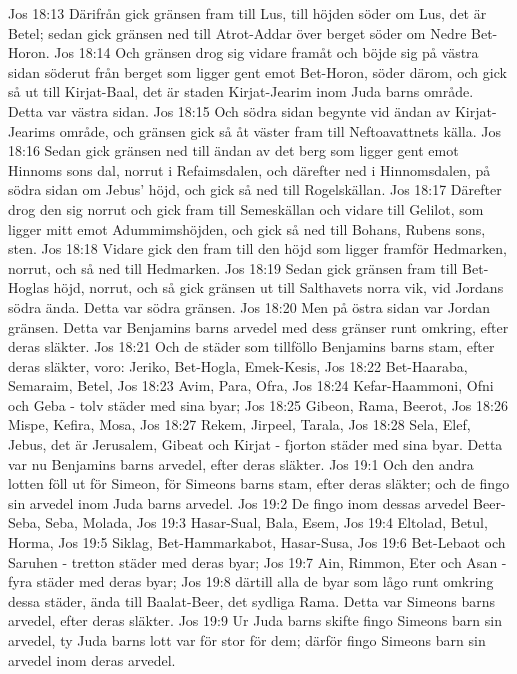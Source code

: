 Jos 18:13  Därifrån gick gränsen fram till Lus, till höjden söder om Lus, det är Betel; sedan gick gränsen ned till Atrot-Addar över berget söder om Nedre Bet-Horon.
Jos 18:14  Och gränsen drog sig vidare framåt och böjde sig på västra sidan söderut från berget som ligger gent emot Bet-Horon, söder därom, och gick så ut till Kirjat-Baal, det är staden Kirjat-Jearim inom Juda barns område. Detta var västra sidan.
Jos 18:15  Och södra sidan begynte vid ändan av Kirjat-Jearims område, och gränsen gick så åt väster fram till Neftoavattnets källa.
Jos 18:16  Sedan gick gränsen ned till ändan av det berg som ligger gent emot Hinnoms sons dal, norrut i Refaimsdalen, och därefter ned i Hinnomsdalen, på södra sidan om Jebus' höjd, och gick så ned till Rogelskällan.
Jos 18:17  Därefter drog den sig norrut och gick fram till Semeskällan och vidare till Gelilot, som ligger mitt emot Adummimshöjden, och gick så ned till Bohans, Rubens sons, sten.
Jos 18:18  Vidare gick den fram till den höjd som ligger framför Hedmarken, norrut, och så ned till Hedmarken.
Jos 18:19  Sedan gick gränsen fram till Bet-Hoglas höjd, norrut, och så gick gränsen ut till Salthavets norra vik, vid Jordans södra ända. Detta var södra gränsen.
Jos 18:20  Men på östra sidan var Jordan gränsen. Detta var Benjamins barns arvedel med dess gränser runt omkring, efter deras släkter.
Jos 18:21  Och de städer som tillföllo Benjamins barns stam, efter deras släkter, voro: Jeriko, Bet-Hogla, Emek-Kesis,
Jos 18:22  Bet-Haaraba, Semaraim, Betel,
Jos 18:23  Avim, Para, Ofra,
Jos 18:24  Kefar-Haammoni, Ofni och Geba - tolv städer med sina byar;
Jos 18:25  Gibeon, Rama, Beerot,
Jos 18:26  Mispe, Kefira, Mosa,
Jos 18:27  Rekem, Jirpeel, Tarala,
Jos 18:28  Sela, Elef, Jebus, det är Jerusalem, Gibeat och Kirjat - fjorton städer med sina byar. Detta var nu Benjamins barns arvedel, efter deras släkter.
Jos 19:1  Och den andra lotten föll ut för Simeon, för Simeons barns stam, efter deras släkter; och de fingo sin arvedel inom Juda barns arvedel.
Jos 19:2  De fingo inom dessas arvedel Beer-Seba, Seba, Molada,
Jos 19:3  Hasar-Sual, Bala, Esem,
Jos 19:4  Eltolad, Betul, Horma,
Jos 19:5  Siklag, Bet-Hammarkabot, Hasar-Susa,
Jos 19:6  Bet-Lebaot och Saruhen - tretton städer med deras byar;
Jos 19:7  Ain, Rimmon, Eter och Asan - fyra städer med deras byar;
Jos 19:8  därtill alla de byar som lågo runt omkring dessa städer, ända till Baalat-Beer, det sydliga Rama. Detta var Simeons barns arvedel, efter deras släkter.
Jos 19:9  Ur Juda barns skifte fingo Simeons barn sin arvedel, ty Juda barns lott var för stor för dem; därför fingo Simeons barn sin arvedel inom deras arvedel.
